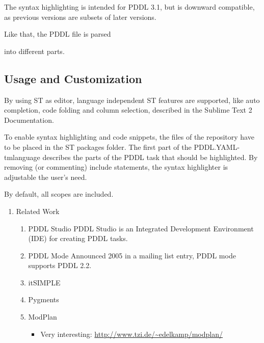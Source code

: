 \documentclass[11pt]{report}
\begin{document}
The syntax highlighting is intended for PDDL 3.1, but is downward
compatible, as previous versions are subsets of later versions.
\begin{center}
\end{center}
Like that, the PDDL file is parsed 
\begin{center}
\end{center}
into different parts. 
\subsection{Usage and Customization}
\label{sec-4-2-2}
By using ST as editor, language independent ST features are supported, like auto
completion, code folding and column selection, described in the
Sublime Text 2 Documentation.

To enable syntax highlighting and code snippets, the files of the
repository have to be placed in the ST packages folder. The first part
of the PDDL.YAML-tmlanguage describes the parts of the PDDL task that
should be highlighted. By removing (or commenting) include statements,
the syntax highlighter is adjustable the user's need.

By default, all scopes are included.

\begin{enumerate}
\item Related Work
\label{sec-4-2-2-1}
\begin{enumerate}
\item PDDL Studio
\label{sec-4-2-2-1-1}
PDDL Studio \parencite{plch2012inspect} is an Integrated Development Environment (IDE) for
creating PDDL tasks. 

\item PDDL Mode
\label{sec-4-2-2-1-2}
Announced 2005 in a mailing list entry, PDDL mode supports PDDL 2.2. 
\item itSIMPLE
\label{sec-4-2-2-1-3}

\item Pygments
\label{sec-4-2-2-1-4}
\item ModPlan
\label{sec-4-2-2-1-5}
\begin{itemize}
\item Very interesting: \url{http://www.tzi.de/~edelkamp/modplan/}
\end{itemize}
\end{enumerate}
\end{enumerate}
\end{document}

